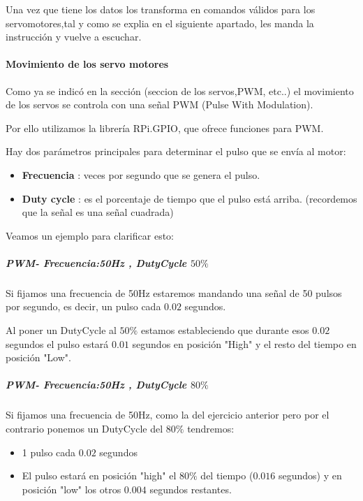 \documentclass[twoside, 12pt]{epstfg}
\begin{document}
Una vez que tiene los datos los transforma en comandos válidos para los servomotores,tal y como se explia en el siguiente apartado, les manda la instrucción y vuelve a escuchar.


\paragraph{Movimiento de los servo motores}



Como ya se indicó en la sección (seccion de los servos,PWM, etc..) el movimiento de los servos se controla con una señal PWM (Pulse With Modulation).

Por ello utilizamos la librería RPi.GPIO, que ofrece funciones para PWM.

Hay dos parámetros principales para determinar el pulso que se envía al motor:
\begin{itemize}
	\item \textbf{Frecuencia} : veces por segundo que se genera el pulso.
	\item \textbf{Duty cycle} : es el porcentaje de tiempo que el pulso está arriba. (recordemos que la señal es una señal cuadrada)
\end{itemize}


Veamos un ejemplo para clarificar esto:

\subparagraph{PWM- Frecuencia:50Hz , DutyCycle $50\%$}



Si fijamos una frecuencia de 50Hz estaremos mandando una señal de 50 pulsos por segundo, es decir, un pulso cada $0.02$ segundos.

Al poner un DutyCycle al $50\%$ estamos estableciendo que durante esos $0.02$ segundos el pulso estará $0.01$ segundos en posición "High" y el resto del tiempo en posición "Low".


\subparagraph {PWM- Frecuencia:50Hz , DutyCycle $80\%$}

Si fijamos una frecuencia de 50Hz, como la del ejercicio anterior pero por el contrario ponemos un DutyCycle del $80\%$ tendremos:
\begin{itemize}
	\item 1 pulso cada $0.02$ segundos
	\item El pulso estará en posición "high" el $80\%$ del tiempo ($0.016$ segundos) y en posición "low" los otros $0.004$ segundos restantes.
\end{itemize}
\end{document}
